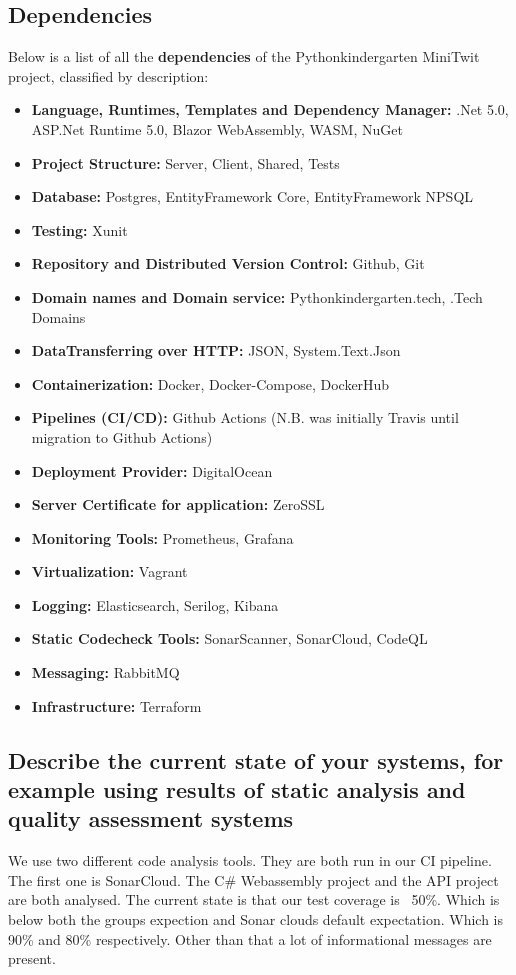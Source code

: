 \subsection{Dependencies}
Below is a list of all the \textbf{dependencies} of the Pythonkindergarten MiniTwit project, classified by description:
\begin{itemize}
    \item \textbf{Language, Runtimes, Templates and Dependency Manager:}
      .Net 5.0, ASP.Net Runtime 5.0, Blazor WebAssembly, WASM, NuGet
    \item \textbf{Project Structure:} Server, Client, Shared, Tests
    \item \textbf{Database:} Postgres, EntityFramework Core, EntityFramework NPSQL
    \item \textbf{Testing:} Xunit
    \item \textbf{Repository and Distributed Version Control:} Github, Git
    \item \textbf{Domain names and Domain service:} Pythonkindergarten.tech, .Tech Domains
    \item \textbf{DataTransferring over HTTP:} JSON, System.Text.Json
    \item \textbf{Containerization:} Docker, Docker-Compose, DockerHub
    \item \textbf{Pipelines (CI/CD):} Github Actions (N.B. was initially Travis until migration to Github Actions)
    \item \textbf{Deployment Provider:} DigitalOcean
    \item \textbf{Server Certificate for application:} ZeroSSL
    \item \textbf{Monitoring Tools:} Prometheus, Grafana
    \item \textbf{Virtualization:} Vagrant
    \item \textbf{Logging:} Elasticsearch, Serilog, Kibana
    \item \textbf{Static Codecheck Tools:} SonarScanner, SonarCloud, CodeQL
    \item \textbf{Messaging:} RabbitMQ
    \item \textbf{Infrastructure:} Terraform
\end{itemize}




\subsection{Describe the current state of your systems, for example using results of static analysis and quality assessment systems}
We use two different code analysis tools. 
They are both run in our CI pipeline. 
The first one is SonarCloud. The C\# Webassembly project and the API project are both analysed. 
The current state is that our test coverage is ~50\%. Which is below both the groups expection and Sonar clouds default expectation. 
Which is 90\% and 80\% respectively. 
Other than that a lot of informational messages are present. 


